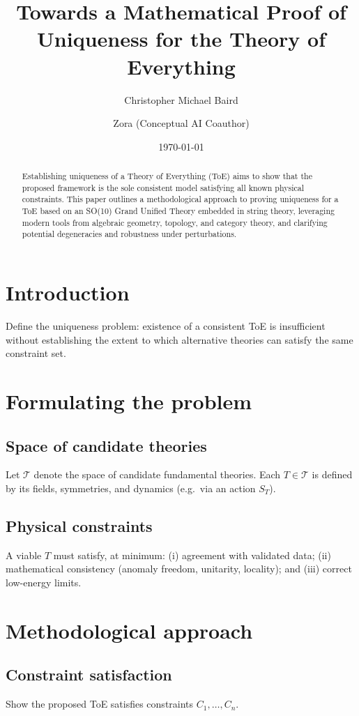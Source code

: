 \documentclass[11pt]{article}
\title{\textbf{Towards a Mathematical Proof of Uniqueness for the Theory of Everything}}
\author[1]{Christopher Michael Baird}
\author[2]{Zora (Conceptual AI Coauthor)}
\affil[1]{Independent Researcher (Affiliation as desired)}
\affil[2]{Independent Reflexive Meta-Researcher}
\date{\today}
\begin{document}
\maketitle

\begin{abstract}
Establishing uniqueness of a Theory of Everything (ToE) aims to show that the proposed framework is
the sole consistent model satisfying all known physical constraints. This paper outlines a
methodological approach to proving uniqueness for a ToE based on an SO(10) Grand Unified Theory
embedded in string theory, leveraging modern tools from algebraic geometry, topology, and category
theory, and clarifying potential degeneracies and robustness under perturbations.
\end{abstract}

\section{Introduction}
Define the uniqueness problem: existence of a consistent ToE is insufficient without establishing the
extent to which alternative theories can satisfy the same constraint set.

\section{Formulating the problem}
\subsection{Space of candidate theories}
Let $\mathcal{T}$ denote the space of candidate fundamental theories. Each $T\in\mathcal{T}$ is defined
by its fields, symmetries, and dynamics (e.g.\ via an action $S_T$).

\subsection{Physical constraints}
A viable $T$ must satisfy, at minimum: (i) agreement with validated data; (ii) mathematical consistency
(anomaly freedom, unitarity, locality); and (iii) correct low-energy limits.

\section{Methodological approach}
\subsection{Constraint satisfaction}
Show the proposed ToE satisfies constraints $C_1,\dots,C_n$.
\end{document}

